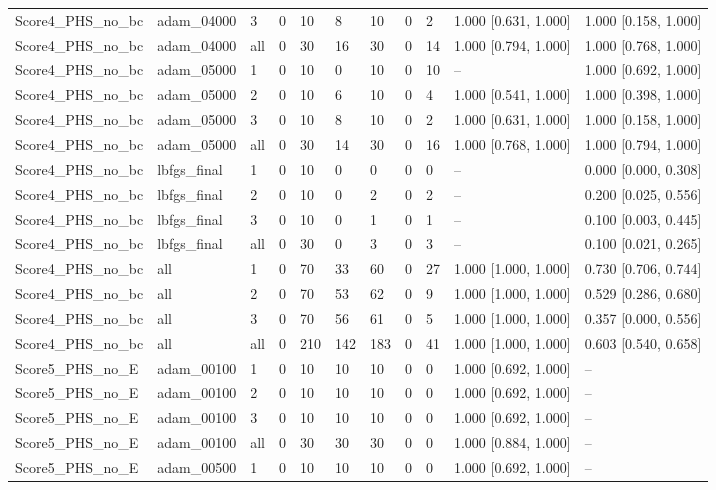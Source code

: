\begin{longtable}{lllllllllll}
Score4\_PHS\_no\_bc & adam\_04000 & 3 & 0 & 10 & 8 & 10 & 0 & 2 & 1.000 [0.631, 1.000] & 1.000 [0.158, 1.000] \\
Score4\_PHS\_no\_bc & adam\_04000 & all & 0 & 30 & 16 & 30 & 0 & 14 & 1.000 [0.794, 1.000] & 1.000 [0.768, 1.000] \\
Score4\_PHS\_no\_bc & adam\_05000 & 1 & 0 & 10 & 0 & 10 & 0 & 10 & -- & 1.000 [0.692, 1.000] \\
Score4\_PHS\_no\_bc & adam\_05000 & 2 & 0 & 10 & 6 & 10 & 0 & 4 & 1.000 [0.541, 1.000] & 1.000 [0.398, 1.000] \\
Score4\_PHS\_no\_bc & adam\_05000 & 3 & 0 & 10 & 8 & 10 & 0 & 2 & 1.000 [0.631, 1.000] & 1.000 [0.158, 1.000] \\
Score4\_PHS\_no\_bc & adam\_05000 & all & 0 & 30 & 14 & 30 & 0 & 16 & 1.000 [0.768, 1.000] & 1.000 [0.794, 1.000] \\
Score4\_PHS\_no\_bc & lbfgs\_final & 1 & 0 & 10 & 0 & 0 & 0 & 0 & -- & 0.000 [0.000, 0.308] \\
Score4\_PHS\_no\_bc & lbfgs\_final & 2 & 0 & 10 & 0 & 2 & 0 & 2 & -- & 0.200 [0.025, 0.556] \\
Score4\_PHS\_no\_bc & lbfgs\_final & 3 & 0 & 10 & 0 & 1 & 0 & 1 & -- & 0.100 [0.003, 0.445] \\
Score4\_PHS\_no\_bc & lbfgs\_final & all & 0 & 30 & 0 & 3 & 0 & 3 & -- & 0.100 [0.021, 0.265] \\
Score4\_PHS\_no\_bc & all & 1 & 0 & 70 & 33 & 60 & 0 & 27 & 1.000 [1.000, 1.000] & 0.730 [0.706, 0.744] \\
Score4\_PHS\_no\_bc & all & 2 & 0 & 70 & 53 & 62 & 0 & 9 & 1.000 [1.000, 1.000] & 0.529 [0.286, 0.680] \\
Score4\_PHS\_no\_bc & all & 3 & 0 & 70 & 56 & 61 & 0 & 5 & 1.000 [1.000, 1.000] & 0.357 [0.000, 0.556] \\
Score4\_PHS\_no\_bc & all & all & 0 & 210 & 142 & 183 & 0 & 41 & 1.000 [1.000, 1.000] & 0.603 [0.540, 0.658] \\
Score5\_PHS\_no\_E & adam\_00100 & 1 & 0 & 10 & 10 & 10 & 0 & 0 & 1.000 [0.692, 1.000] & -- \\
Score5\_PHS\_no\_E & adam\_00100 & 2 & 0 & 10 & 10 & 10 & 0 & 0 & 1.000 [0.692, 1.000] & -- \\
Score5\_PHS\_no\_E & adam\_00100 & 3 & 0 & 10 & 10 & 10 & 0 & 0 & 1.000 [0.692, 1.000] & -- \\
Score5\_PHS\_no\_E & adam\_00100 & all & 0 & 30 & 30 & 30 & 0 & 0 & 1.000 [0.884, 1.000] & -- \\
Score5\_PHS\_no\_E & adam\_00500 & 1 & 0 & 10 & 10 & 10 & 0 & 0 & 1.000 [0.692, 1.000] & -- \\

\end{longtable}
